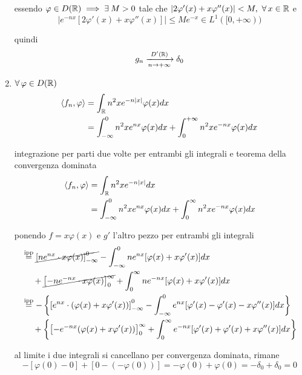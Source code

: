 \begin{enumerate}
essendo $\varphi \in D(\RR) \implies \exists M > 0$ tale che $| 2\varphi '(x) + x\varphi ''(x)| < M,\ \forall x\in \RR $ e\begin{equation*}
\left| e^{ - nx}[ 2\varphi '(x) + x\varphi ''(x)]\right| \leqslant Me^{ - x} \in L^{1}([ 0, + \infty))
\end{equation*}

quindi\begin{equation*}
g_{n}\xrightarrow[n\rightarrow + \infty ]{D'(\mathbb{R})} \delta _{0}
\end{equation*}
\item $\forall \varphi \in D(\RR)$\begin{equation*}
\begin{aligned}
\langle f_{n} ,\varphi \rangle  & = \int _{\mathbb{R} } n^{2} xe^{ - n| x| } \varphi (x) dx\\
 & = \int ^{0}_{ - \infty } n^{2} xe^{nx} \varphi (x) dx + \int ^{ + \infty }_{0} n^{2} xe^{ - nx} \varphi (x) dx
\end{aligned}
\end{equation*}

integrazione per parti due volte per entrambi gli integrali e teorema della convergenza dominata\begin{align*}
\langle f_{n} ,\varphi \rangle  & = \int _{\mathbb{R} } n^{2} xe^{ - n| x| } dx\\
 & = \int ^{0}_{ - \infty } n^{2} xe^{nx} \varphi (x) dx + \int ^{\infty }_{0} n^{2} xe^{ - nx} \varphi (x) dx
\end{align*}

ponendo $f = x\varphi (x)$ e $g'$ l'altro pezzo per entrambi gli integrali\begin{align*}
 & \overset{\text{ipp}}{ = }\cancel{\left[ ne^{nx} \cdot x\varphi (x)\right]^{0}_{ - \infty }} - \int ^{0}_{ - \infty } ne^{nx}[ \varphi (x) + x\varphi '(x)] dx\\
 & \ \ \ \ + \cancel{\left[ - ne^{ - nx} \cdot x\varphi (x)\right]^{\infty }_{0}} + \int ^{\infty }_{0} ne^{ - nx}[ \varphi (x) + x\varphi '(x)] dx\\
 & \overset{\text{ipp}}{ = } - \left\{\left[ e^{nx} \cdot (\varphi (x) + x\varphi '(x))\right]^{0}_{ - \infty } - \int ^{0}_{ - \infty } e^{nx}[ \varphi '(x) - \varphi '(x) - x\varphi ''(x)] dx\right\}\\
 & \ \ \ \ + \left\{\left[ - e^{ - nx}(\varphi (x) + x\varphi '(x))\right]^{\infty }_{0} + \int ^{\infty }_{0} e^{ - nx}[ \varphi '(x) + \varphi '(x) + x\varphi ''(x)] dx\right\}
\end{align*}

al limite i due integrali si cancellano per convergenza dominata, rimane\begin{equation*}
- [ \varphi (0) - 0] + [ 0 - (- \varphi (0))] = - \varphi (0) + \varphi (0) = - \delta _{0} + \delta _{0} = 0
\end{equation*}
\end{enumerate}
